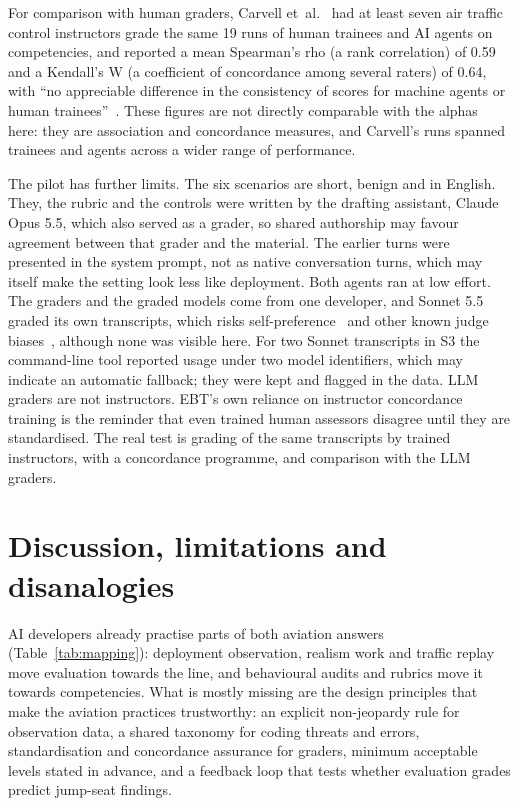 \documentclass[11pt]{article}
\begin{document}
For comparison with human graders, Carvell et~al.~\cite{carvell2026} had at least seven air traffic control instructors grade the same 19 runs of human trainees and AI agents on competencies, and reported a mean Spearman's rho (a rank correlation) of 0.59 and a Kendall's W (a coefficient of concordance among several raters) of 0.64, with ``no appreciable difference in the consistency of scores for machine agents or human trainees''~\cite[section~4.1]{carvell2026}. These figures are not directly comparable with the alphas here: they are association and concordance measures, and Carvell's runs spanned trainees and agents across a wider range of performance.

The pilot has further limits. The six scenarios are short, benign and in English. They, the rubric and the controls were written by the drafting assistant, Claude Opus 5.5, which also served as a grader, so shared authorship may favour agreement between that grader and the material. The earlier turns were presented in the system prompt, not as native conversation turns, which may itself make the setting look less like deployment. Both agents ran at low effort. The graders and the graded models come from one developer, and Sonnet 5.5 graded its own transcripts, which risks self-preference~\cite{panickssery2024} and other known judge biases~\cite{zheng2023}, although none was visible here. For two Sonnet transcripts in S3 the command-line tool reported usage under two model identifiers, which may indicate an automatic fallback; they were kept and flagged in the data. LLM graders are not instructors. EBT's own reliance on instructor concordance training is the reminder that even trained human assessors disagree until they are standardised. The real test is grading of the same transcripts by trained instructors, with a concordance programme, and comparison with the LLM graders.

\section{Discussion, limitations and disanalogies}\label{sec:discussion}

AI developers already practise parts of both aviation answers (Table~\ref{tab:mapping}): deployment observation, realism work and traffic replay move evaluation towards the line, and behavioural audits and rubrics move it towards competencies. What is mostly missing are the design principles that make the aviation practices trustworthy: an explicit non-jeopardy rule for observation data, a shared taxonomy for coding threats and errors, standardisation and concordance assurance for graders, minimum acceptable levels stated in advance, and a feedback loop that tests whether evaluation grades predict jump-seat findings.
\end{document}
